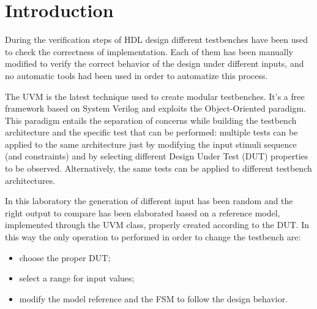 %
\chapter{Introduction}
\label{chap1}

During the verification steps of HDL design different testbenches have been used to 
check the correctness of implementation. Each of them has been manually modified to 
verify the correct behavior of the design under different inputs, and no automatic tools 
had been used in order to automatize this process.

The UVM is the latest technique used to create modular testbenches. It's a free framework 
based on System Verilog and exploits the Object-Oriented paradigm. This paradigm entails
the separation of concerns while building the testbench architecture and the specific test that
can be performed: multiple tests can be applied to the same architecture just by modifying the
input stimuli sequence (and constraints) and by selecting different Design Under Test (DUT)
properties to be observed. Alternatively, the same tests can be applied to different testbench architectures.

In this laboratory the generation of different input has been random and the right output to compare has 
been elaborated based on a reference model, implemented through the UVM class, properly created according 
to the DUT. In this way the only operation to performed in order to change the testbench are:
\begin{itemize}
    \item choose the proper DUT;
    \item select a range for input values;
    \item modify the model reference and the FSM to follow the design behavior.
\end{itemize}


            